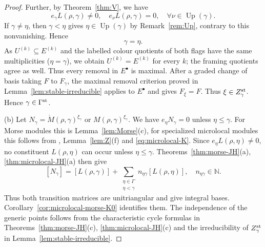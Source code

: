 \documentclass[11pt,reqno]{amsart}
\theoremstyle{definition}
\theoremstyle{remark}
\def\Up{\operatorname{Up}}
\begin{document}
\begin{proof}
Further, by Theorem~\ref{thm:V}, we have 
$$e_\gamma L(\rho,\gamma)\ne0
,\quad
e_\nu L(\rho,\gamma)=0
,\quad
\forall\nu\in\Up(\gamma).$$
If $\gamma\ne\eta$, then
$\gamma<\eta$ gives $\eta\in\Up(\gamma)$ by Remark~\ref{rem:Up},
contrary to this nonvanishing. Hence 
$$\gamma=\eta.$$
As $U^{(k)}\subseteq E^{(k)}$ and the labelled colour quotients
of both flags have the same multiplicities ($\eta=\gamma$), we obtain
$U^{(k)}=E^{(k)}$ for every $k$; the framing quotients agree as well.
Thus every removal in $E^\bullet$ is maximal.
After a graded change of basis taking $F$ to $F_\gamma$, the
maximal removal criterion proved in Lemma~\ref{lem:stable-irreducible}
applies to $E^\bullet$ and gives $F_\xi=F$.
Thus $\xi\in Z_\gamma^{\rm st}$. 
Hence $\gamma\in\Gamma^{\rm st}$.

(b) Let $N_\gamma=\mathring M(\rho,\gamma)^{\xi_\gamma}$ or $M(\rho,\gamma)^{\xi_\gamma}$.
We have $e_\eta N_\gamma=0$ unless $\eta\leqslant\gamma$.
For Morse modules this is Lemma~\ref{lem:Morse}(c), for specialized
microlocal modules this follows from
\cite[Cor.~5.4.10]{KS90}, Lemma~\ref{lem:Z}(f) and \eqref{eq:microlocal-K}.
Since $e_\eta L(\rho,\eta)\neq0$,
no constituent $L(\rho,\eta)$ can occur unless $\eta\leqslant\gamma$.
Theorems~\ref{thm:morse-JH}(a), \ref{thm:microlocal-JH}(a)
then give
\[
 [N_\gamma]=[L(\rho,\gamma)]+
 \sum_{\substack{\eta\in\Gamma\\\eta<\gamma}}
 n_{\eta\gamma}[L(\rho,\eta)],\quad n_{\eta\gamma}\in\mathbb N.
\]
Thus both transition matrices are unitriangular and give integral
bases. Corollary~\ref{cor:microlocal-morse-K0} identifies them.
The independence of the generic points follows from the
characteristic cycle formulas in Theorems~\ref{thm:morse-JH}(c),
\ref{thm:microlocal-JH}(c) and the irreducibility of
$Z_\gamma^{\rm st}$ in Lemma~\ref{lem:stable-irreducible}.
\end{proof}
\end{document}

